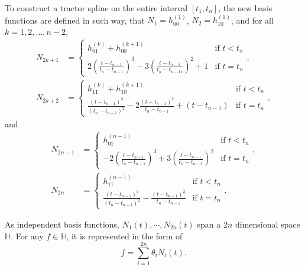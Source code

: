 To construct a tractor spline on the entire interval $[t_1,t_n]$, the new basis functions are defined in such way, that $N_1 = h^{(1)}_{00}$, $N_2 = h^{(1)}_{10}$, and for all $k=1,2,\ldots,n-2$, 
\begin{align}
N_{2k+1}&=
\begin{cases}
h_{01}^{(k)}+h_{00}^{(k+1)} & \mbox{if $t<t_n$}\\
2(\frac{t-t_{n-1}}{t_{n}-t_{n-1}})^3-3(\frac{t-t_{n-1}}{t_{n}-t_{n-1s}})^2+1 &  \mbox{if $t=t_n$}
\end{cases},\\
N_{2k+2}&=
\begin{cases}
h_{11}^{(k)}+h_{10}^{(k+1)} & \mbox{if $t<t_n$}\\
\frac{(t-t_{n-1})^3}{(t_{n}-t_{n-1})^2}-2\frac{(t-t_{n-1})^2}{t_{n}-t_{n-1}}+(t-t_{n-1}) & \mbox{if $t=t_n$}
\end{cases},
\end{align}
and
\begin{align}
N_{2n-1} &= 
\begin{cases}
h_{01}^{(n-1)} & \mbox{if $t<t_n$}\\ 
-2(\frac{t-t_{n-1}}{t_{n}-t_{n-1}})^3+3(\frac{t-t_{n-1}}{t_{n}-t_{n-1}})^2 & \mbox{if $t=t_n$}
\end{cases},\\
N_{2n} &= 
\begin{cases}
h_{11}^{(n-1)} & \mbox{if $t<t_n$}\\
\frac{(t-t_{n-1})^3}{(t_{n}-t_{n-1})^2}-\frac{(t-t_{n-1})^2}{t_{n}-t_{n-1}} & \mbox{if $t=t_n$}
\end{cases}.
\end{align}



As independent basis functions, $N_1(t), \cdots, N_{2n}(t)$ span a $2n$ dimensional space $\mathbb{H}$. For any $f \in \mathbb{H}$, it is represented in the form of
\begin{equation}
f=\sum_{i=1}^{2n} \theta_i N_i(t).
\end{equation}

